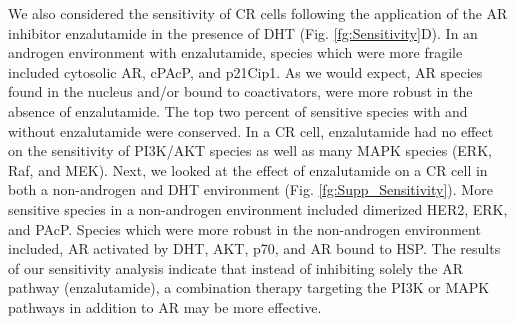 \documentclass[12pt]{article}
\begin{document}
We also considered the sensitivity of CR cells following the application of the AR inhibitor enzalutamide in the presence of DHT (Fig. \ref{fg:Sensitivity}D). 
In an androgen environment with enzalutamide, species which were more fragile included cytosolic AR, cPAcP, and p21Cip1. 
As we would expect, AR species found in the nucleus and/or bound to coactivators, were more robust in the absence of enzalutamide. 
The top two percent of sensitive species with and without enzalutamide were conserved. 
In a CR cell, enzalutamide had no effect on the sensitivity of PI3K/AKT species as well as many MAPK species (ERK, Raf, and MEK). 
Next, we looked at the effect of enzalutamide on a CR cell in both a non-androgen and DHT environment (Fig. \ref{fg:Supp_Sensitivity}). 
More sensitive species in a non-androgen environment included dimerized HER2, ERK, and PAcP. 
Species which were more robust in the non-androgen environment included, AR activated by DHT, AKT, p70, and AR bound to HSP.
The results of our sensitivity analysis indicate that instead of inhibiting solely the AR pathway (enzalutamide), a combination therapy targeting the PI3K or MAPK pathways in addition to AR may be more effective.
  
  
\end{document}
